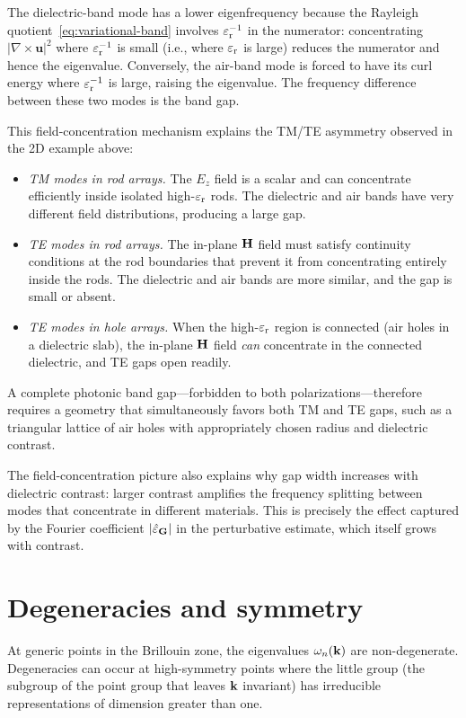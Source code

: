 The dielectric-band mode has a lower eigenfrequency because the Rayleigh
quotient~\eqref{eq:variational-band} involves $\varepsilon_{\mathrm{r}}^{-1}$ in the
numerator: concentrating $|\nabla\times\mathbf{u}|^2$ where $\varepsilon_{\mathrm{r}}^{-1}$
is small (i.e., where $\varepsilon_{\mathrm{r}}$ is large) reduces the numerator and hence
the eigenvalue. Conversely, the air-band mode is forced to have its curl
energy where $\varepsilon_{\mathrm{r}}^{-1}$ is large, raising the eigenvalue. The frequency
difference between these two modes is the band gap.

This field-concentration mechanism explains the TM/TE asymmetry observed
in the 2D example above:
\begin{itemize}
\item \emph{TM modes in rod arrays.} The $E_z$ field is a scalar and
 can concentrate efficiently inside isolated high-$\varepsilon_{\mathrm{r}}$ rods. The
 dielectric and air bands have very different field distributions,
 producing a large gap.
\item \emph{TE modes in rod arrays.} The in-plane $\mathbf{H}$ field must
 satisfy continuity conditions at the rod boundaries that prevent it
 from concentrating entirely inside the rods. The dielectric and air
 bands are more similar, and the gap is small or absent.
\item \emph{TE modes in hole arrays.} When the high-$\varepsilon_{\mathrm{r}}$ region is
 connected (air holes in a dielectric slab), the in-plane $\mathbf{H}$ field
 \emph{can} concentrate in the connected dielectric, and TE gaps open
 readily.
\end{itemize}
A complete photonic band gap---forbidden to both polarizations---therefore
requires a geometry that simultaneously favors both TM and TE gaps, such
as a triangular lattice of air holes with appropriately chosen radius and
dielectric contrast.

The field-concentration picture also explains why gap width increases
with dielectric contrast: larger contrast amplifies the frequency
splitting between modes that concentrate in different materials. This is
precisely the effect captured by the Fourier coefficient
$|\hat{\varepsilon}_{\mathbf{G}}|$ in the perturbative estimate, which itself grows
with contrast.


\section{Degeneracies and symmetry}
\label{sec:degeneracies}

At generic points in the Brillouin zone, the eigenvalues $\omega_n(\mathbf{k})$
are non-degenerate. Degeneracies can occur at high-symmetry points where
the little group (the subgroup of the point group that leaves $\mathbf{k}$
invariant) has irreducible representations of dimension greater than one.


